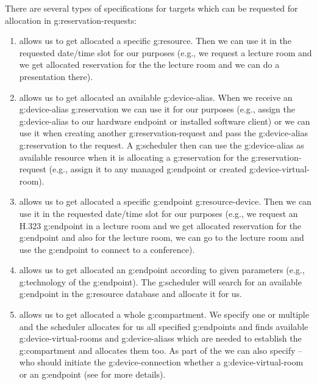 There are several types of specifications for targets which can be requested for allocation in \glspl{g:reservation-request}:
\begin{enumerate}
\item {} allows us to get allocated a specific \gls{g:resource}. Then we can use it in the requested date/time slot for our purposes (e.g., we request a lecture room and we get allocated reservation for the the lecture room and we can do a presentation there).

\item {} allows us to get allocated an available \gls{g:device-alias}. When we receive an \gls{g:device-alias} \gls{g:reservation} we can use it for our purposes (e.g., assign the \gls{g:device-alias} to our hardware endpoint or installed software client) or we can use it when creating another \gls{g:reservation-request} and pass the \gls{g:device-alias} \gls{g:reservation} to the request. A \gls{g:scheduler} then can use the \gls{g:device-alias} as available resource when it is allocating a \gls{g:reservation} for the \gls{g:reservation-request} (e.g., assign it to any managed \gls{g:endpoint} or created \gls{g:device-virtual-room}). 

\item {} allows us to get allocated a specific \gls{g:endpoint} \gls{g:resource-device}. Then we can use it in the requested date/time slot for our purposes (e.g., we request an H.323 \gls{g:endpoint} in a lecture room and we get allocated reservation for the \gls{g:endpoint} and also for the lecture room, we can go to the lecture room and use the \gls{g:endpoint} to connect to a conference).

\item {} allows us to get allocated an \gls{g:endpoint} according to given parameters (e.g., \gls{g:technology} of the \gls{g:endpoint}). The \gls{g:scheduler} will search for an available \gls{g:endpoint} in the \gls{g:resource} database and allocate it for us.

\item {} allows us to get allocated a whole \gls{g:compartment}. We specify one or multiple  and the scheduler allocates for us all specified \glspl{g:endpoint} and finds available \glspl{g:device-virtual-room} and \glspl{g:device-alias} which are needed to establish the \gls{g:compartment} and allocates them too. As part of the  we can also specify  -- who should initiate the \gls{g:device-connection} whether a \gls{g:device-virtual-room} or an \gls{g:endpoint} (see  for more details).


\end{enumerate}
